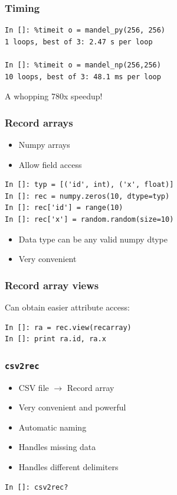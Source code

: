 \documentclass[14pt,compress]{beamer}
\newcounter{time}
\newcommand{\typ}[1]{\lstinline{#1}}
\begin{document}
\begin{frame}[fragile]
    \frametitle{Timing}
    \begin{lstlisting}
In []: %timeit o = mandel_py(256, 256)
1 loops, best of 3: 2.47 s per loop

In []: %timeit o = mandel_np(256,256)
10 loops, best of 3: 48.1 ms per loop
    \end{lstlisting}
A whopping 780x speedup!
\end{frame}


\begin{frame}[fragile]
    \frametitle{Record arrays}
    \begin{itemize}
        \item Numpy arrays
        \item Allow field access 
    \end{itemize}
    \begin{lstlisting}
In []: typ = [('id', int), ('x', float)]
In []: rec = numpy.zeros(10, dtype=typ)
In []: rec['id'] = range(10)
In []: rec['x'] = random.random(size=10)
    \end{lstlisting}
    \begin{itemize}
        \item Data type can be any valid numpy dtype
        \item Very convenient
    \end{itemize}
\end{frame}

\begin{frame}[fragile]
    \frametitle{Record array views}
Can obtain easier attribute access:

    \begin{lstlisting}
In []: ra = rec.view(recarray)
In []: print ra.id, ra.x
    \end{lstlisting}
\end{frame}

\begin{frame}[fragile]
    \frametitle{\typ{csv2rec}}
    \begin{itemize}
        \item CSV file $\rightarrow$ Record array
        \item Very convenient and powerful
        \item Automatic naming
        \item Handles missing data
        \item Handles different delimiters
    \end{itemize}
    \begin{lstlisting}
In []: csv2rec?
    \end{lstlisting}
\end{frame}
\end{document}
